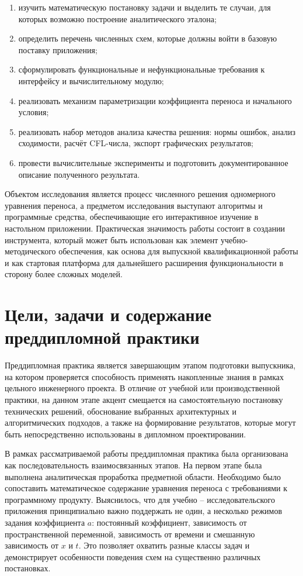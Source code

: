 \documentclass[a4paper,14pt]{extreport}
\begin{document}
\begin{enumerate}
    \item изучить математическую постановку задачи и выделить те случаи, для которых возможно построение аналитического эталона;
    \item определить перечень численных схем, которые должны войти в базовую поставку приложения;
    \item сформулировать функциональные и нефункциональные требования к интерфейсу и вычислительному модулю;
    \item реализовать механизм параметризации коэффициента переноса и начального условия;
    \item реализовать набор методов анализа качества решения: нормы ошибок, анализ сходимости, расчёт CFL-числа, экспорт графических результатов;
    \item провести вычислительные эксперименты и подготовить документированное описание полученного результата.
\end{enumerate}

Объектом исследования является процесс численного решения одномерного уравнения переноса, а предметом исследования выступают алгоритмы и программные средства, обеспечивающие его интерактивное изучение в настольном приложении. Практическая значимость работы состоит в создании инструмента, который может быть использован как элемент учебно-методического обеспечения, как основа для выпускной квалификационной работы и как стартовая платформа для дальнейшего расширения функциональности в сторону более сложных моделей.

\chapter{Цели, задачи и содержание преддипломной практики}

Преддипломная практика является завершающим этапом подготовки выпускника, на котором проверяется способность применять накопленные знания в рамках цельного инженерного проекта. В отличие от учебной или производственной практики, на данном этапе акцент смещается на самостоятельную постановку технических решений, обоснование выбранных архитектурных и алгоритмических подходов, а также на формирование результатов, которые могут быть непосредственно использованы в дипломном проектировании.

В рамках рассматриваемой работы преддипломная практика была организована как последовательность взаимосвязанных этапов. На первом этапе была выполнена аналитическая проработка предметной области. Необходимо было сопоставить математическое содержание уравнения переноса с требованиями к программному продукту. Выяснилось, что для учебно -- исследовательского приложения принципиально важно поддержать не один, а несколько режимов задания коэффициента $a$: постоянный коэффициент, зависимость от пространственной переменной, зависимость от времени и смешанную зависимость от $x$ и $t$. Это позволяет охватить разные классы задач и демонстрирует особенности поведения схем на существенно различных постановках.
\end{document}
